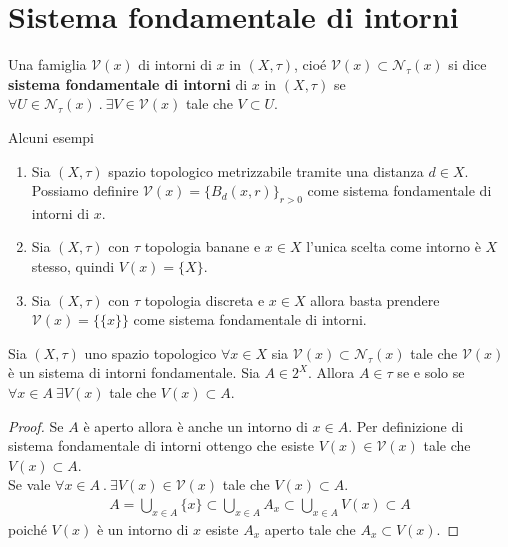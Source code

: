 \section{Sistema fondamentale di intorni}

\begin{definition}
	Una famiglia $\mathcal{V}(x)$ di intorni di $x$ in $(X,\tau)$, cioé $\mathcal{V}(x) \subset \mathcal{N}_\tau(x)$ si dice \textbf{sistema fondamentale di intorni} di $x$ in $(X,\tau)$ se $\forall U \in \mathcal{N}_\tau(x)\ .\ \exists V \in \mathcal{V}(x)$ tale che $V \subset U$.
\end{definition}
Alcuni esempi
\begin{enumerate}
	\item Sia $(X,\tau)$ spazio topologico metrizzabile tramite una distanza $d \in X$. Possiamo definire $\mathcal{V}(x) = \{B_d(x,r)\}_{r>0}$ come sistema fondamentale di intorni di $x$. 
	\item Sia $(X,\tau)$ con $\tau$ topologia banane e $x \in X$ l'unica scelta come intorno è $X$ stesso, quindi $V(x) = \{X\}$.
	\item Sia $(X,\tau)$ con $\tau$ topologia discreta e $x \in X$ allora basta prendere $\mathcal{V}(x) = \{\{x\}\}$ come sistema fondamentale di intorni.
\end{enumerate}

\begin{proposition}
	Sia $(X,\tau)$ uno spazio topologico $\forall x \in X$ sia $\mathcal{V}(x) \subset \mathcal{N}_\tau(x)$ tale che $\mathcal{V}(x)$ è un sistema di intorni fondamentale. Sia $A \in 2^X$. Allora $A \in \tau$ se e solo se $\forall x \in A\ \exists V(x)$ tale che $V(x) \subset A$.
\end{proposition}
\begin{proof}
	Se $A$ è aperto allora è anche un intorno di $x \in A$. Per definizione di sistema fondamentale di intorni ottengo che esiste $V(x) \in \mathcal{V}(x)$ tale che $V(x) \subset A$.\\
	
	Se vale $\forall x \in A\ .\ \exists V(x) \in \mathcal{V}(x)$ tale che $V(x) \subset A$. 
	\begin{equation}
	\begin{aligned}
		A = \bigcup_{x \in A} \{x\} \subset \bigcup_{x \in A} A_x \subset \bigcup_{x \in A} V(x) \subset A
	\end{aligned}
	\end{equation}
	poiché $V(x)$ è un intorno di $x$ esiste $A_x$ aperto tale che $A_x \subset V(x)$.
\end{proof}

